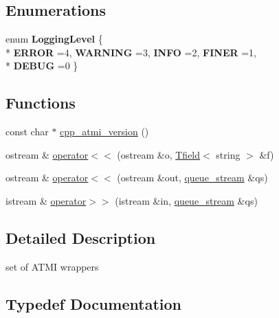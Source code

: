 \subsection*{Enumerations}
\begin{DoxyCompactItemize}
\item 
\hypertarget{namespaceatmi_aa29c2b27a3c520ac8bd57e9dbe613325}{}enum {\bfseries Logging\+Level} \{ \\*
{\bfseries E\+R\+R\+O\+R} =4, 
{\bfseries W\+A\+R\+N\+I\+N\+G} =3, 
{\bfseries I\+N\+F\+O} =2, 
{\bfseries F\+I\+N\+E\+R} =1, 
\\*
{\bfseries D\+E\+B\+U\+G} =0
 \}\label{namespaceatmi_aa29c2b27a3c520ac8bd57e9dbe613325}

\end{DoxyCompactItemize}
\subsection*{Functions}
\begin{DoxyCompactItemize}
\item 
const char $\ast$ \hyperlink{namespaceatmi_a1db5d7cd1f711e43cd63dedbd9e3f8d1}{cpp\+\_\+atmi\+\_\+version} ()
\item 
ostream \& \hyperlink{namespaceatmi_aaf1bf620dc4ebad71a8f2b98e45107e3}{operator$<$$<$} (ostream \&o, \hyperlink{classatmi_1_1_tfield}{Tfield}$<$ string $>$ \&f)
\item 
ostream \& \hyperlink{namespaceatmi_af3fe9481b5d6e19d1fb56e27baff2154}{operator$<$$<$} (ostream \&out, \hyperlink{classatmi_1_1queue__stream}{queue\+\_\+stream} \&qs)
\item 
istream \& \hyperlink{namespaceatmi_adb0ca17e8de1eecddb5c95b86441ffdc}{operator$>$$>$} (istream \&in, \hyperlink{classatmi_1_1queue__stream}{queue\+\_\+stream} \&qs)
\end{DoxyCompactItemize}


\subsection{Detailed Description}
set of A\+T\+M\+I wrappers 

\subsection{Typedef Documentation}
\hypertarget{namespaceatmi_a9eff55eddc901da817f1b087613b18cc}{}
